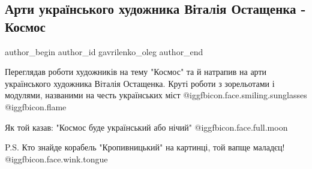 
 
 
 
 
 
\subsection{Арти українського художника Віталія Остащенка - Космос}
\label{sec:23_08_2021.fb.gavrilenko_oleg.1.kosmos_hudozhnik_ostaschenko_vitalij}
 
\ifcmt
 author_begin
   author_id gavrilenko_oleg
 author_end
\fi

Переглядав роботи художників на тему "Космос" та й натрапив на арти
українського художника Віталія Остащенка. Круті роботи з зорельотами і
модулями, названими на честь українських міст @igg{fbicon.face.smiling.sunglasses}  @igg{fbicon.flame} 


Як той казав: "Космос буде український або нічий" @igg{fbicon.face.full.moon} 

P.S. Кто знайде корабель "Кропивницький" на картинці, той вапще маладєц! @igg{fbicon.face.wink.tongue} 


